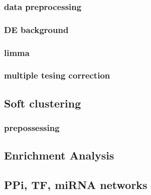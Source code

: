         \subsubsection{data preprocessing}
        \subsubsection{DE background}
        \subsubsection{limma}
        \subsubsection{multiple tesing correction}

    \subsection{Soft clustering}
        \subsubsection{prepossessing}
    
    \subsection{Enrichment Analysis}
    
    \subsection{PPi, TF, miRNA networks}